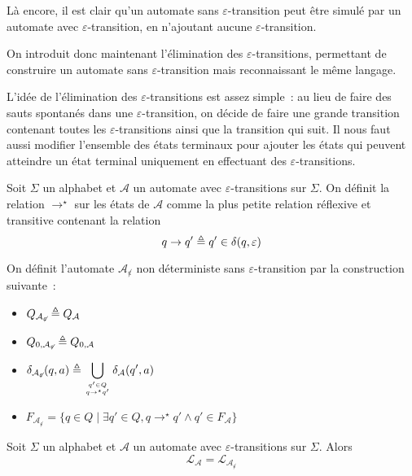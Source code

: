 Là encore, il est clair qu'un automate sans $\varepsilon$-transition peut être
simulé par un automate avec $\varepsilon$-transition, en n'ajoutant aucune
$\varepsilon$-transition.

On introduit donc maintenant l'élimination des $\varepsilon$-transitions,
permettant de construire un automate sans $\varepsilon$-transition mais
reconnaissant le même langage.

L'idée de l'élimination des $\varepsilon$-transitions est assez simple~: au lieu
de faire des sauts spontanés dans une $\varepsilon$-transition, on décide de
faire une grande transition contenant toutes les $\varepsilon$-transitions ainsi
que la transition qui suit. Il nous faut aussi modifier l'ensemble des états
terminaux pour ajouter les états qui peuvent atteindre un état terminal
uniquement en effectuant des $\varepsilon$-transitions.

\begin{definition}
  Soit $\Sigma$ un alphabet et $\mathcal A$ un automate avec
  $\varepsilon$-transitions sur $\Sigma$. On définit la relation $\to^\star$ sur
  les états de $\mathcal A$ comme la plus petite relation  réflexive et
  transitive contenant la relation
  \[q\to q' \triangleq q' \in \delta(q,\varepsilon)\]

  On définit l'automate $\mathcal A_{\not\varepsilon}$ non déterministe sans
  $\varepsilon$-transition par la construction suivante~:
  \begin{itemize}
  \item $Q_{\mathcal A_{\not\varepsilon}} \triangleq Q_\mathcal A$
  \item $Q_{0,\mathcal A_{\not\varepsilon}} \triangleq Q_{0,\mathcal A}$
  \item $\displaystyle\delta_{\mathcal A_{\not\varepsilon}}(q,a) \triangleq
    \bigcup_{{q' \in Q}\atop{q\to^\star q'}} \delta_{\mathcal A}(q',a)$
  \item $F_{\mathcal A_{\not\varepsilon}} =\{q \in Q
    \mid \exists q' \in Q, q \to^\star q' \land q' \in F_\mathcal A\}$
  \end{itemize}
\end{definition}

\begin{proposition}\label{prop.epsi.equiv}
  Soit $\Sigma$ un alphabet et $\mathcal A$ un automate avec
  $\varepsilon$-transitions sur $\Sigma$. Alors
  \[\mathcal L_{\mathcal A} = \mathcal L_{\mathcal A_{\not\varepsilon}}\]
\end{proposition}

